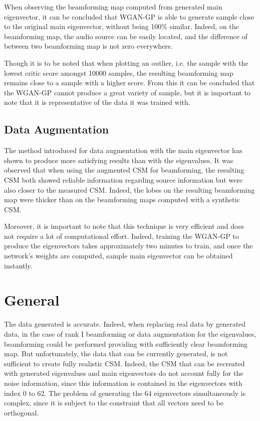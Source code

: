 \documentclass[11pt,a4paper,twoside]{report}
\begin{document}
When observing the beamforming map computed from generated main eigenvector, it can be concluded that WGAN-GP is able to generate sample close to the original main eigenvector, without being 100\% similar. Indeed, on the beamforming map, the audio source can be easily located, and the difference of between two beamforming map is not zero everywhere.

Though it is to be noted that when plotting an outlier, i.e. the sample with the lowest critic score amongst 10000 samples, the resulting beamforming map remains close to a sample with a higher score. From this it can be concluded that the WGAN-GP cannot produce a great variety of sample, but it is important to note that it is representative of the data it was trained with.  

\subsection{Data Augmentation}

The method introduced for data augmentation with the main eigenvector has shown to produce more satisfying results than with the eigenvalues. It was observed that when using the augmented CSM for beamforming, the resulting CSM both showed reliable information regarding source information but were also closer to the measured CSM. Indeed, the lobes on the resulting beamforming map were thicker than on the beamforming maps computed with a synthetic CSM.

Moreover, it is important to note that  this technique is very efficient and does not require a lot of computational effort. Indeed, training the WGAN-GP to produce  the eigenvectors takes approximately two minutes to train, and once the network's weights are computed, sample main eigenvector can be obtained instantly.

\section{General}

The data generated is accurate. Indeed, when replacing real data by generated data, in the case of rank I beamforming or data augmentation for the eigenvalues, beamforming could be performed providing with sufficiently clear beamforming map. But unfortunately, the data that can be currently generated, is not sufficient to create fully realistic CSM. Indeed, the CSM that can be recreated with generated eigenvalues and main eigenvectors do not account fully for the noise information, since this information is contained in the eigenvectors with index $0$ to $62$. The problem of generating the 64 eigenvectors simultaneously is complex, since it is subject to the constraint that all vectors need to be orthogonal. 
\end{document}
